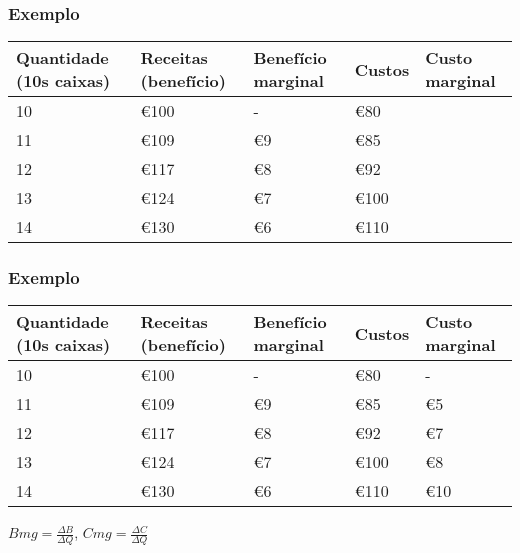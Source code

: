 \begin{frame}
	\frametitle{Exemplo}

	\begin{table}
		\begin{tabular}{p{1.8cm}p{1.8cm}p{1.8cm}p{1.8cm}p{1.8cm}}
			Quantidade (10s caixas) & Receitas (benef\'icio) & Benef\'icio marginal & Custos & Custo marginal \\
			\hline\hline
			10 & \euro 100 & - & \euro 80 & \\
			11 & \euro 109 & \euro 9 & \euro 85 & \\
			12 & \euro 117 & \euro 8 & \euro 92 & \\
			13 & \euro 124 & \euro 7 & \euro 100 & \\
			14 & \euro 130 & \euro 6 & \euro 110 & 
		\end{tabular}
	\end{table}
\end{frame}


\begin{frame}
	\frametitle{Exemplo}

	\begin{table}
		\rowcolors{1}{red!5}{red!20}
		\begin{tabular}{p{1.8cm}p{1.8cm}p{1.8cm}p{1.8cm}p{1.8cm}}
			Quantidade (10s caixas) & Receitas (benef\'icio) & Benef\'icio marginal & Custos & Custo marginal \\
			\hline\hline
			10 & \euro 100 & - & \euro 80 & - \\
			11 & \euro 109 & \euro 9 & \euro 85 & \euro 5 \\
			12 & \euro 117 & \euro 8 & \euro 92 & \euro 7 \\
			13 & \euro 124 & \euro 7 & \euro 100 & \euro 8 \\
			14 & \euro 130 & \euro 6 & \euro 110 & \euro 10
		\end{tabular}
	\end{table}

	$Bmg = \frac{\Delta B}{\Delta Q}$, $Cmg = \frac{\Delta C}{\Delta Q}$

\end{frame}

